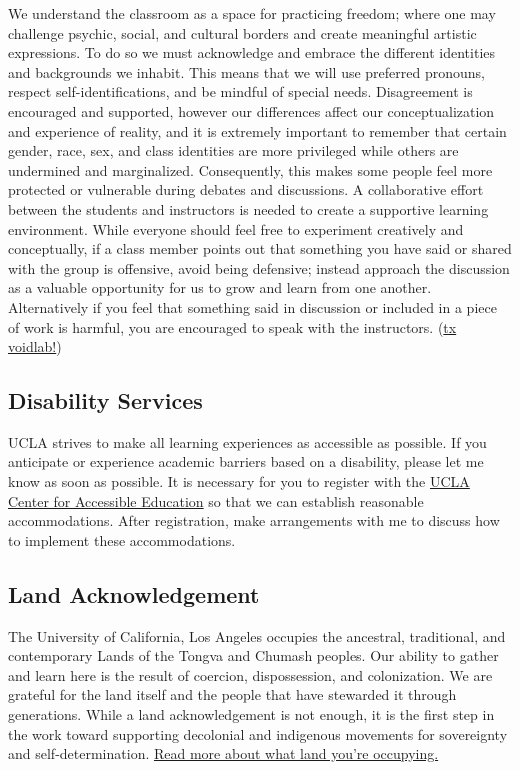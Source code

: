 \documentclass[10pt,letter,english]{article}
\begin{document}
We understand the classroom as a space for practicing freedom; where one may challenge psychic, social, and cultural borders and create meaningful artistic expressions. To do so we must acknowledge and embrace the different identities and backgrounds we inhabit. This means that we will use preferred pronouns, respect self-identifications, and be mindful of special needs. Disagreement is encouraged and supported, however our differences affect our conceptualization and experience of reality, and it is extremely important to remember that certain gender, race, sex, and class identities are more privileged while others are undermined and marginalized. Consequently, this makes some people feel more protected or vulnerable during debates and discussions. A collaborative effort between the students and instructors is needed to create a supportive learning environment. While everyone should feel free to experiment creatively and conceptually, if a class member points out that something you have said or shared with the group is offensive, avoid being defensive; instead approach the discussion as a valuable opportunity for us to grow and learn from one another. Alternatively if you feel that something said in discussion or included in a piece of work is harmful, you are encouraged to speak with the instructors. (\href{https://github.com/voidlab/diversity-statement}{{tx voidlab!}})

\hypertarget{disability-services}{%
      \subsection{Disability Services}\label{disability-services}}

UCLA strives to make all learning experiences as accessible as possible. If you anticipate or experience academic barriers based on a disability, please let me know as soon as possible. It is necessary for you to register with the \href{http://www.cae.ucla.edu/}{{UCLA Center for Accessible Education}} so that we can establish reasonable accommodations. After registration, make arrangements with me to discuss how to implement these accommodations.

\hypertarget{land-acknowledgement}{%
      \subsection{Land Acknowledgement}\label{land-acknowledgement}}

The University of California, Los Angeles occupies the ancestral, traditional, and contemporary Lands of the Tongva and Chumash peoples. Our ability to gather and learn here is the result of coercion, dispossession, and colonization. We are grateful for the land itself and the people that have stewarded it through generations. While a land acknowledgement is not enough, it is the first step in the work toward supporting decolonial and indigenous movements for sovereignty and self-determination. \href{https://native-land.ca/}{{Read more about what land you're occupying.}}
\end{document}
